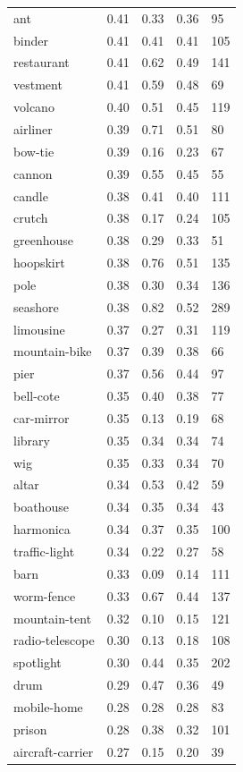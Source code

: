 \begin{center}
\begin{longtable}{lllll}
ant & 0.41 & 0.33 & 0.36 & 95 \\
binder & 0.41 & 0.41 & 0.41 & 105 \\
restaurant & 0.41 & 0.62 & 0.49 & 141 \\
vestment & 0.41 & 0.59 & 0.48 & 69 \\
volcano & 0.40 & 0.51 & 0.45 & 119 \\
airliner & 0.39 & 0.71 & 0.51 & 80 \\
bow-tie & 0.39 & 0.16 & 0.23 & 67 \\
cannon & 0.39 & 0.55 & 0.45 & 55 \\
candle & 0.38 & 0.41 & 0.40 & 111 \\
crutch & 0.38 & 0.17 & 0.24 & 105 \\
greenhouse & 0.38 & 0.29 & 0.33 & 51 \\
hoopskirt & 0.38 & 0.76 & 0.51 & 135 \\
pole & 0.38 & 0.30 & 0.34 & 136 \\
seashore & 0.38 & 0.82 & 0.52 & 289 \\
limousine & 0.37 & 0.27 & 0.31 & 119 \\
mountain-bike & 0.37 & 0.39 & 0.38 & 66 \\
pier & 0.37 & 0.56 & 0.44 & 97 \\
bell-cote & 0.35 & 0.40 & 0.38 & 77 \\
car-mirror & 0.35 & 0.13 & 0.19 & 68 \\
library & 0.35 & 0.34 & 0.34 & 74 \\
wig & 0.35 & 0.33 & 0.34 & 70 \\
altar & 0.34 & 0.53 & 0.42 & 59 \\
boathouse & 0.34 & 0.35 & 0.34 & 43 \\
harmonica & 0.34 & 0.37 & 0.35 & 100 \\
traffic-light & 0.34 & 0.22 & 0.27 & 58 \\
barn & 0.33 & 0.09 & 0.14 & 111 \\
worm-fence & 0.33 & 0.67 & 0.44 & 137 \\
mountain-tent & 0.32 & 0.10 & 0.15 & 121 \\
radio-telescope & 0.30 & 0.13 & 0.18 & 108 \\
spotlight & 0.30 & 0.44 & 0.35 & 202 \\
drum & 0.29 & 0.47 & 0.36 & 49 \\
mobile-home & 0.28 & 0.28 & 0.28 & 83 \\
prison & 0.28 & 0.38 & 0.32 & 101 \\
aircraft-carrier & 0.27 & 0.15 & 0.20 & 39 \\

\end{longtable}
\end{center}
